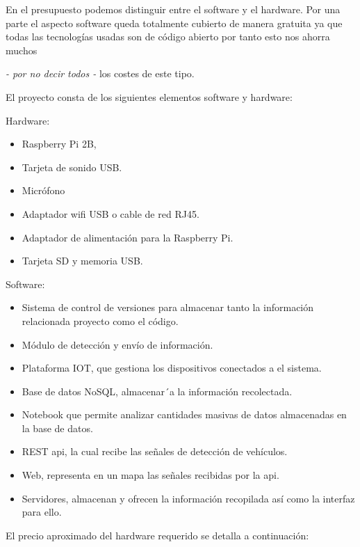 En el presupuesto podemos distinguir entre el software y el hardware. Por una parte el aspecto software queda totalmente cubierto de manera gratuita ya que todas las tecnologías usadas son de código abierto por tanto esto nos ahorra muchos {\textit{- por no decir todos -} los costes de este tipo.

\bigskip
El proyecto consta de los siguientes elementos software y hardware:

\bigskip
Hardware:
\begin{itemize}
	\item Raspberry Pi 2B,
	\item Tarjeta de sonido USB.
	\item Micrófono
	\item Adaptador wifi USB o cable de red RJ45.
	\item Adaptador de alimentación para la Raspberry Pi.
	\item Tarjeta SD y memoria USB.
\end{itemize}


Software:
\begin{itemize}
	\item Sistema de control de versiones para almacenar tanto la información relacionada proyecto como el código.
	\item Módulo de detección y envío de información.
	\item Plataforma IOT, que gestiona los dispositivos conectados a el sistema.
	\item Base de datos NoSQL, almacenar´a la información recolectada.
	\item Notebook que permite analizar cantidades masivas de datos almacenadas en la base de datos.
	\item REST api, la cual recibe las señales de detección de vehículos.
	\item Web, representa en un mapa las señales recibidas por la api.
	\item Servidores, almacenan y ofrecen la información recopilada así como la interfaz para ello.
\end{itemize}

\bigskip

El precio aproximado del hardware requerido se detalla a continuación:

\newpage

}
